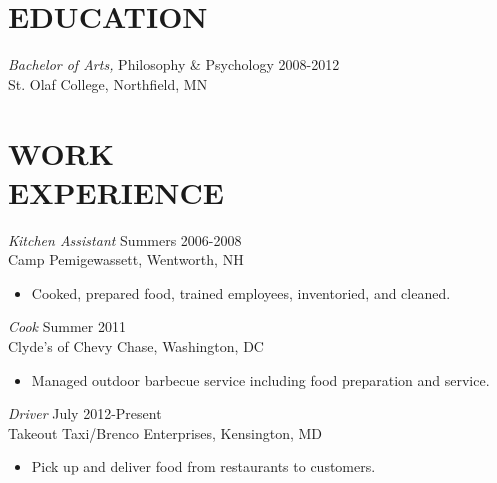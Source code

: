 \documentclass[line,margin]{res}
\begin{document}
\address{10106 Summit Avenue, Kensington, MD 20895}
\address{(301) 651-2656 | c.smith.brian@gmail.com}

 
\begin{resume}
 

 
 
\section{EDUCATION} 
  	{\sl Bachelor of Arts,} Philosophy \& Psychology \hfill 2008-2012 \\ 
                St. Olaf College, Northfield, MN \\
                
 \section{WORK\\EXPERIENCE}                
                {\sl Kitchen Assistant} \hfill        Summers 2006-2008 \\
                Camp Pemigewassett, Wentworth, NH
                  \begin{itemize}
                   \item Cooked, prepared food, trained employees, inventoried, and cleaned. 
                   \end{itemize} 
                 
                 {\sl Cook} \hfill        Summer 2011 \\
                Clyde's of Chevy Chase, Washington, DC
                  \begin{itemize}
                   \item Managed outdoor barbecue service including food preparation and service. 
                   \end{itemize} 

				{\sl Driver} \hfill        July 2012-Present \\
                Takeout Taxi/Brenco Enterprises, Kensington, MD
                  \begin{itemize}
                   \item Pick up and deliver food from restaurants to customers. 
                   \end{itemize} 
                   

\end{resume}
\end{document}
